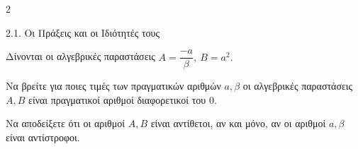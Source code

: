 \begin{ylh}{2}
    \item 2.1. Οι Πράξεις και οι Ιδιότητές τους
\end{ylh}
Δίνονται οι αλγεβρικές παραστάσεις $A = \dfrac{- a}{\beta},\ B = a^{2}.$

\begin{alist}
\item Να βρείτε για ποιες τιμές των πραγματικών αριθμών $a,\beta$ οι αλγεβρικές παραστάσεις $A,B$ είναι πραγματικοί αριθμοί διαφορετικοί του 0.
\item Να αποδείξετε ότι οι αριθμοί $A,B$ είναι αντίθετοι, αν και μόνο, αν οι αριθμοί $a,\beta$ είναι αντίστροφοι.
\end{alist}

